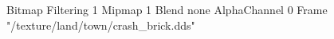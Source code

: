 {Bitmap
	{Filtering 1}
	{Mipmap 1}
	{Blend none}
	{AlphaChannel 0}
	{Frame "/texture/land/town/crash_brick.dds"}
}
